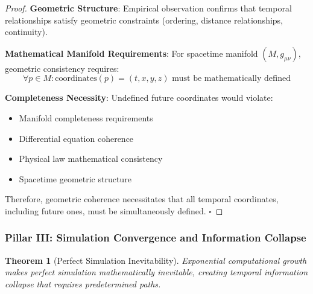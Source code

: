 \documentclass[11pt,a4paper]{article}
\newtheorem{theorem}{Theorem}[section]
\theoremstyle{remark}
\begin{document}
\begin{proof}
\textbf{Geometric Structure}: Empirical observation confirms that temporal relationships satisfy geometric constraints (ordering, distance relationships, continuity).

\textbf{Mathematical Manifold Requirements}: For spacetime manifold $(M, g_{\mu\nu})$, geometric consistency requires:
\begin{equation}
\forall p \in M: \text{coordinates}(p) = (t, x, y, z) \text{ must be mathematically defined}
\end{equation}

\textbf{Completeness Necessity}: Undefined future coordinates would violate:
\begin{itemize}
\item Manifold completeness requirements
\item Differential equation coherence
\item Physical law mathematical consistency
\item Spacetime geometric structure
\end{itemize}

Therefore, geometric coherence necessitates that all temporal coordinates, including future ones, must be simultaneously defined. $\square$
\end{proof}

\subsubsection{Pillar III: Simulation Convergence and Information Collapse}

\begin{theorem}[Perfect Simulation Inevitability]
Exponential computational growth makes perfect simulation mathematically inevitable, creating temporal information collapse that requires predetermined paths.
\end{theorem}
\end{document}
